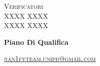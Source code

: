 \documentclass[8pt]{article}
\begin{document}
\begin{titlepage}
\begin{minipage}[t]{0.47\textwidth}
		{\large{\textsc{Verificatori}}
			\vspace{3mm}
			{\\\large{\textsc{XXXX XXXX}\\}} 
			{\large{\textsc{XXXX XXXX}}}
			
		}
		\vspace{4mm}\vspace{4mm}
	\end{minipage}
	\vspace{4cm}
	\begin{center}
		\begin{flushright}
			{\fontsize{30pt}{52pt}\selectfont \textbf{Piano Di Qualifica}} %
		\end{flushright}
		\vspace{3cm}
	\end{center}
	\vspace{10 cm}
	{\small \textsc{\href{mailto: nan1fyteam.unipd@gmail.com}{nan1fyteam.unipd@gmail.com}}}
\end{titlepage}
\pagestyle{mystyle}
\end{document}
